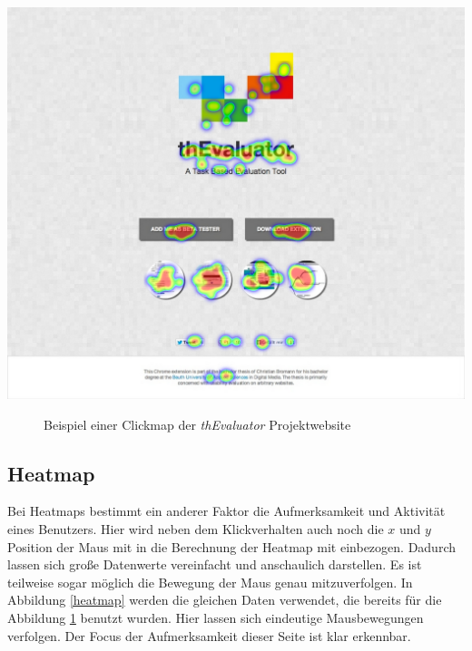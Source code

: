 \vspace{0.3cm}
\begin{center}
\includegraphics[scale=0.35]{./images/clickmap}
\end{center}
\begin{figure}[htb]
   \centering
   \caption{Beispiel einer Clickmap der \textit{thEvaluator} Projektwebsite}
    \label{clickmap}
\end{figure}


\subsection{Heatmap}

Bei Heatmaps bestimmt ein anderer Faktor die Aufmerksamkeit und Aktivität eines Benutzers. Hier wird neben dem Klickverhalten auch noch die $ x $ und $ y $ Position der Maus mit in die Berechnung der Heatmap mit einbezogen. Dadurch lassen sich große Datenwerte vereinfacht und anschaulich darstellen. Es ist teilweise sogar möglich die Bewegung der Maus genau mitzuverfolgen. In Abbildung \ref{heatmap} werden die gleichen Daten verwendet, die bereits für die Abbildung \ref{clickmap} benutzt wurden. Hier lassen sich eindeutige Mausbewegungen verfolgen. Der Focus der Aufmerksamkeit dieser Seite ist klar erkennbar.

